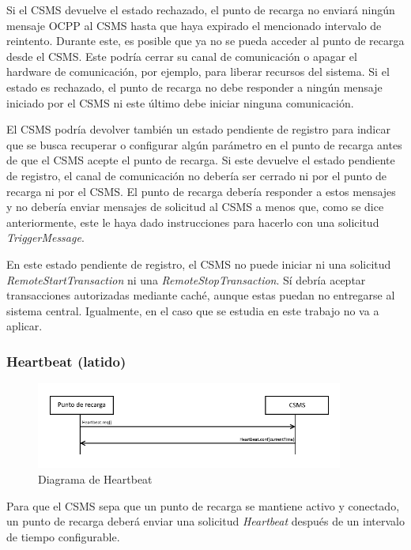 \documentclass[12pt,a4paper,onecolumn,oneside]{report}
\begin{document}
Si el CSMS devuelve el estado rechazado, el punto de recarga no enviará ningún mensaje OCPP al CSMS hasta que haya expirado el mencionado intervalo de reintento. Durante este, es posible que ya no se pueda acceder al punto de recarga desde el CSMS. Este podría cerrar su canal de comunicación o apagar el hardware de comunicación, por ejemplo, para liberar recursos del sistema. Si el estado es rechazado, el punto de recarga no debe responder a ningún mensaje iniciado por el CSMS ni este último debe iniciar ninguna comunicación.

El CSMS podría devolver también un estado pendiente de registro para indicar que se busca recuperar o configurar algún parámetro en el punto de recarga antes de que el CSMS acepte el punto de recarga. Si este devuelve el estado pendiente de registro, el canal de comunicación no debería ser cerrado ni por el punto de recarga ni por el CSMS. El punto de recarga debería responder a estos mensajes y no debería enviar mensajes de solicitud al CSMS a menos que, como se dice anteriormente, este le haya dado instrucciones para hacerlo con una solicitud \textit{TriggerMessage}.

En este estado pendiente de registro, el CSMS no puede iniciar ni una solicitud \textit{RemoteStartTransaction} ni una \textit{RemoteStopTransaction}. Sí debría aceptar transacciones autorizadas mediante caché, aunque estas puedan no entregarse al sistema central. Igualmente, en el caso que se estudia en este trabajo no va a aplicar.

\subsubsection{Heartbeat (latido)}
\label{Heartbeat (latido)}


\begin{figure}[h] 
\centering
  \includegraphics[width=0.9\textwidth]{figuras/diagramaheartbeat.png}
  \caption[Diagrama de \textit{Heartbeat}]{Diagrama de Heartbeat\\
  }
  \label{fig:diagramaheartbeat}
\end{figure}


Para que el CSMS sepa que un punto de recarga se mantiene activo y conectado, un punto de recarga deberá enviar una solicitud \textit{Heartbeat} después de un intervalo de tiempo configurable.
\end{document}
